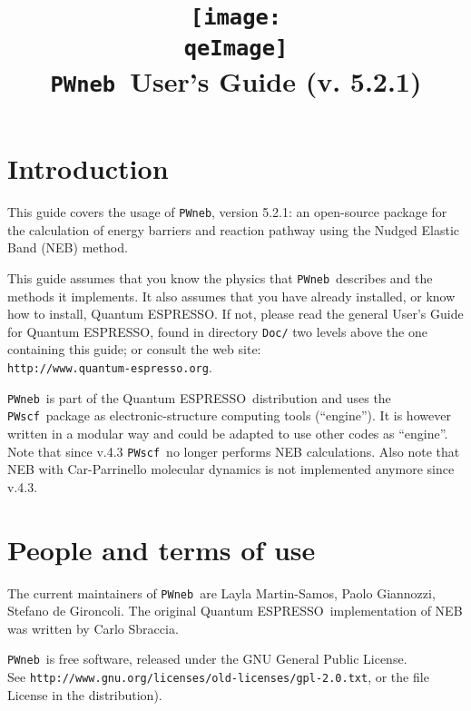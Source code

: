 \documentclass[12pt,a4paper]{article}
\def\version{5.2.1}
\def\qe{{\sc Quantum ESPRESSO}}
\def\NEB{\texttt{PWneb}} %
\def\PWscf{\texttt{PWscf}}
\begin{document}
 
\author{}
\date{}

\def\qeImage{../../Doc/quantum_espresso.pdf}

\title{
  \texttt{[image: \\qeImage]} \\
  \Huge \NEB\ User's Guide (v. \version)
}

\maketitle

\tableofcontents

\section{Introduction}

This guide covers the usage of \NEB, version \version: 
an open-source package for the calculation of energy barriers 
and reaction pathway using the Nudged Elastic Band (NEB) method.

This guide assumes that you know the physics 
that \NEB\ describes and the methods it implements.
It also assumes  that you have already installed,
or know how to install, \qe. If not, please read
the general User's Guide for \qe, found in 
directory \texttt{Doc/} two levels above the 
one containing this guide; or consult the web site:\\
\texttt{http://www.quantum-espresso.org}.

\NEB \ is part of the \qe \ distribution and uses the \PWscf\
package as electronic-structure computing tools (``engine''). 
It is however written in a modular way and could be adapted 
to use other codes as ``engine''. Note that since v.4.3 \PWscf\ no 
longer performs NEB calculations. Also note that NEB with 
Car-Parrinello molecular dynamics is not implemented anymore since v.4.3.

\section{People and terms of use}
The current maintainers of \NEB\ are Layla Martin-Samos,
Paolo Giannozzi, Stefano de Gironcoli.
The original \qe \ implementation of NEB was written 
by Carlo Sbraccia.

\NEB\ is free software, released under the 
GNU General Public License. \\ See
\texttt{http://www.gnu.org/licenses/old-licenses/gpl-2.0.txt}, 
or the file License in the distribution).
    
\end{document}
